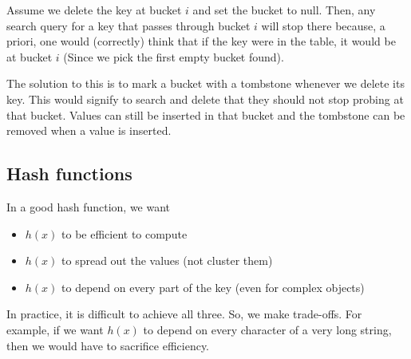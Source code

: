 \documentclass[11pt]{article}
\begin{document}
Assume we delete the key at bucket $i$ and set the bucket to null. Then, any search query for a key that passes through bucket $i$ will stop there because, a priori, one would (correctly) think that if the key were in the table, it would be at bucket $i$ (Since we pick the first empty bucket found). 

The solution to this is to mark a bucket with a tombstone whenever we delete its key. This would signify to search and delete that they should not stop probing at that bucket. Values can still be inserted in that bucket and the tombstone can be removed when a value is inserted. 

\subsection{Hash functions}

In a good hash function, we want 
\begin{itemize}
    \item $h(x)$ to be efficient to compute 
    \item $h(x)$ to spread out the values (not cluster them)
    \item $h(x)$ to depend on every part of the key (even for complex objects) 
\end{itemize}
In practice, it is difficult to achieve all three. So, we make trade-offs. For example, if we want $h(x)$ to depend on every character of a very long string, then we would have to sacrifice efficiency. 
\end{document}
